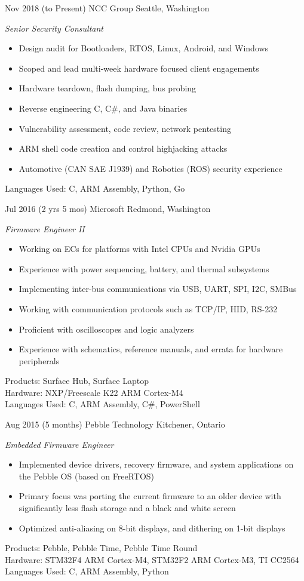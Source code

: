 \documentclass[print]{friggeri-cv} %
\begin{document}
\begin{entrylist}

\entry
{Nov 2018}
{(to Present)}
{NCC Group}
{Seattle, Washington}
{\emph{Senior Security Consultant}
\begin{itemize}
\item Design audit for Bootloaders, RTOS, Linux, Android, and Windows
\item Scoped and lead multi-week hardware focused client engagements
\item Hardware teardown, flash dumping, bus probing
\item Reverse engineering C, C\#, and Java binaries
\item Vulnerability assessment, code review, network pentesting
\item ARM shell code creation and control highjacking attacks
\item Automotive (CAN SAE J1939) and Robotics (ROS) security experience
\end{itemize}
Languages Used: C, ARM Assembly, Python, Go \\
}

\entry
{Jul 2016}
{(2 yrs 5 mos)}
{Microsoft}
{Redmond, Washington}
{\emph{Firmware Engineer II}
\begin{itemize}
\item Working on ECs for platforms with Intel CPUs and Nvidia GPUs
\item Experience with power sequencing, battery, and thermal subsystems
\item Implementing inter-bus communications via USB, UART, SPI, I2C, SMBus
\item Working with communication protocols such as TCP/IP, HID, RS-232
\item Proficient with oscilloscopes and logic analyzers
\item Experience with schematics, reference manuals, and errata for hardware peripherals
\end{itemize}
Products: Surface Hub, Surface Laptop \\
Hardware: NXP/Freescale K22 ARM Cortex-M4 \\
Languages Used: C, ARM Assembly, C\#, PowerShell \\
}

\entry
{Aug 2015}
{(5 months)}
{Pebble Technology}
{Kitchener, Ontario}
{\emph{Embedded Firmware Engineer}
\begin{itemize}
\item Implemented device drivers, recovery firmware, and system applications on the Pebble OS (based on FreeRTOS)
\item Primary focus was porting the current firmware to an older device with significantly less flash storage and a black and white screen
\item Optimized anti-aliasing on 8-bit displays, and dithering on 1-bit displays
\end{itemize}
Products: Pebble, Pebble Time, Pebble Time Round \\
Hardware: STM32F4 ARM Cortex-M4, STM32F2 ARM Cortex-M3, TI CC2564
Languages Used: C, ARM Assembly, Python \\
}


\end{entrylist}
\end{document}

